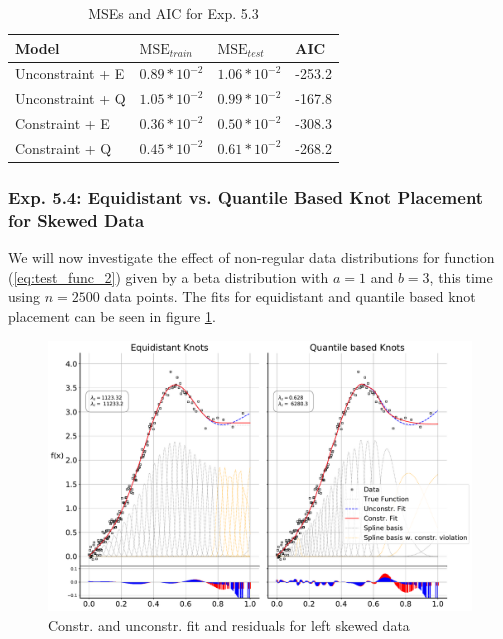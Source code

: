\documentclass[10pt,a4paper]{article}
\begin{document}
\begin{table}[H]
	\centering
	\begin{tabular}{|l|l|l|l|}
		\hline
		\textbf{Model} & \textbf{$\text{MSE}_{train}$} & \textbf{$\text{MSE}_{test}$}  & \textbf{AIC} \\ \hline \toprule
		Unconstraint + E  & $0.89 * 10^{-2}$  & $1.06 * 10^{-2}$ & -253.2       \\ \hline
		Unconstraint + Q  & $1.05 * 10^{-2}$  & $0.99 * 10^{-2}$ & -167.8       \\ \hline
		Constraint + E    & $0.36 * 10^{-2}$  & $0.50 * 10^{-2}$ & -308.3       \\ \hline
		Constraint + Q    & $0.45 * 10^{-2}$  & $0.61 * 10^{-2}$ & -268.2      \\ \hline \bottomrule
	\end{tabular}
	\caption{MSEs and AIC for Exp. 5.3}
	\label{tab:metrics_53}
\end{table}


\subsubsection{Exp. 5.4: Equidistant vs. Quantile Based Knot Placement for Skewed Data}

We will now investigate the effect of non-regular data distributions for function (\ref{eq:test_func_2}) given by a beta distribution with $a = 1$ and $b = 3$, this time using $n=2500$ data points. The fits for equidistant and quantile based knot placement can be seen in figure \ref{fig:fit_left_skew_2500}. 

\begin{figure}[H]
	\centering
	\includegraphics[width=\columnwidth]{../thesisplots/exp_beta/exp_left_skewed_data_ndata_2500_rseed_1.pdf}
	\caption{Constr. and unconstr. fit and residuals for left skewed data}
	\label{fig:fit_left_skew_2500}
\end{figure}
\end{document}
